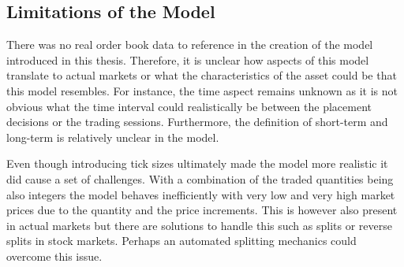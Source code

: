 \subsection{Limitations of the Model}


There was no real order book data to reference in the creation of the model
introduced in this thesis. Therefore, it is unclear how aspects of this
model translate to actual markets or what the characteristics of the 
asset could be that this model resembles. For instance, the time aspect
remains unknown as it is not obvious what the time interval could
realistically be between the placement decisions or the trading 
sessions. Furthermore, the definition of short-term and long-term is
relatively unclear in the model.

Even though introducing
tick sizes ultimately made the model more realistic it did cause a 
set of challenges. With a combination of the traded quantities being
also integers the model behaves inefficiently with very low and very
high market prices due to the quantity and the price increments. This
is however also present in actual markets but there are solutions to handle
this such as splits or reverse splits in stock markets. Perhaps an
automated splitting mechanics could overcome this issue.

